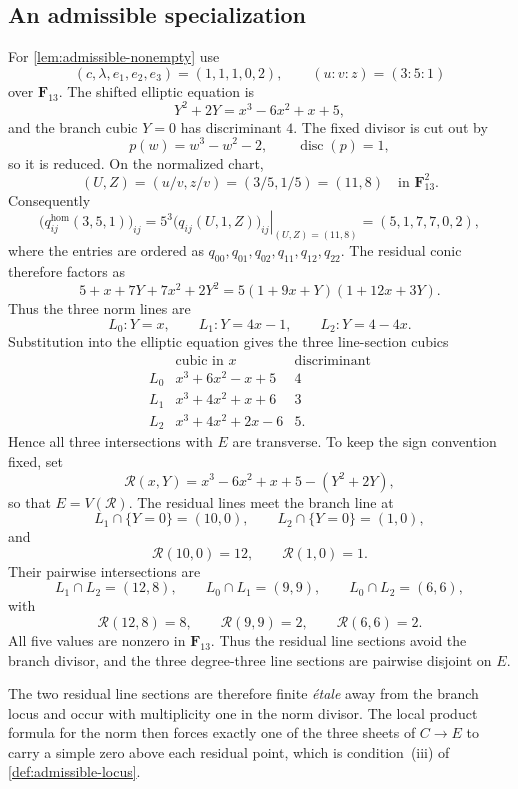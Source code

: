 \documentclass[10pt]{amsart}
\numberwithin{equation}{section}
\theoremstyle{definition}
\theoremstyle{remark}
\begin{document}
\subsection{An admissible specialization}
\label{app:admissible-specialization}
For \cref{lem:admissible-nonempty} use
\[
 (c,\lambda,e_1,e_2,e_3)=(1,1,1,0,2),\qquad (u:v:z)=(3:5:1)
\]
over $\mathbf F_{13}$.  The shifted elliptic equation is
\[
 Y^2+2Y=x^3-6x^2+x+5,
\]
and the branch cubic $Y=0$ has discriminant $4$.  The fixed divisor is cut
out by
\[
 p(w)=w^3-w^2-2,
 \qquad \operatorname{disc}(p)=1,
\]
so it is reduced.  On the normalized chart,
\[
 (U,Z)=(u/v,z/v)=(3/5,1/5)=(11,8)
 \quad\text{in }\mathbf F_{13}^2.
\]
Consequently
\[
 \bigl(q_{ij}^{\mathrm{hom}}(3,5,1)\bigr)_{ij}
 =\left.5^3\bigl(q_{ij}(U,1,Z)\bigr)_{ij}
   \right|_{(U,Z)=(11,8)}
 =(5,1,7,7,0,2),
\]
where the entries are ordered as
$q_{00},q_{01},q_{02},q_{11},q_{12},q_{22}$.  The residual conic therefore
factors as
\[
 5+x+7Y+7x^2+2Y^2
 =5(1+9x+Y)(1+12x+3Y).
\]
Thus the three norm lines are
\[
 L_0:Y=x,\qquad L_1:Y=4x-1,\qquad L_2:Y=4-4x.
\]
Substitution into the elliptic equation gives the three line-section cubics
\[
\begin{array}{c|c|c}
&\text{cubic in }x&\text{discriminant}\\ \hline
L_0&x^3+6x^2-x+5&4\\
L_1&x^3+4x^2+x+6&3\\
L_2&x^3+4x^2+2x-6&5.
\end{array}
\]
Hence all three intersections with $E$ are transverse.  To keep the sign
convention fixed, set
\[
 \mathcal R(x,Y)=x^3-6x^2+x+5-(Y^2+2Y),
\]
so that $E=V(\mathcal R)$.  The residual lines meet the branch line at
\[
 L_1\cap\{Y=0\}=(10,0),\qquad
 L_2\cap\{Y=0\}=(1,0),
\]
and
\[
 \mathcal R(10,0)=12,\qquad \mathcal R(1,0)=1.
\]
Their pairwise intersections are
\[
 L_1\cap L_2=(12,8),\qquad
 L_0\cap L_1=(9,9),\qquad
 L_0\cap L_2=(6,6),
\]
with
\[
 \mathcal R(12,8)=8,\qquad
 \mathcal R(9,9)=2,\qquad
 \mathcal R(6,6)=2.
\]
All five values are nonzero in $\mathbf F_{13}$.  Thus the residual line
sections avoid the branch divisor, and the three degree-three line sections
are pairwise disjoint on $E$.

The two residual line sections are therefore finite \emph{\'etale} away from
the branch locus and occur with multiplicity one in the norm divisor.  The
local product formula for the norm then forces exactly one of the three
sheets of $C\to E$ to carry a simple zero above each residual point, which is
condition~(iii) of \cref{def:admissible-locus}.
\end{document}
